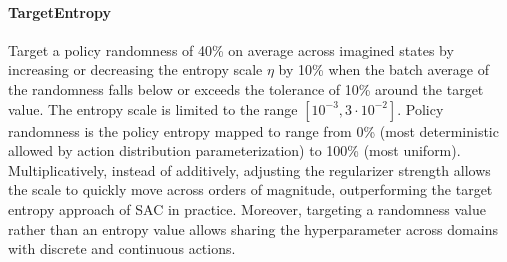 \paragraph{TargetEntropy} Target a policy randomness of 40\% on average across imagined states by increasing or decreasing the entropy scale $\eta$ by 10\% when the batch average of the randomness falls below or exceeds the tolerance of 10\% around the target value. The entropy scale is limited to the range $[10^{-3}, 3\cdot10^{-2}]$. Policy randomness is the policy entropy mapped to range from 0\% (most deterministic allowed by action distribution parameterization) to 100\% (most uniform). Multiplicatively, instead of additively, adjusting the regularizer strength allows the scale to quickly move across orders of magnitude, outperforming the target entropy approach of SAC \citep{haarnoja2018sac} in practice. Moreover, targeting a randomness value rather than an entropy value allows sharing the hyperparameter across domains with discrete and continuous actions.

\restoregeometry